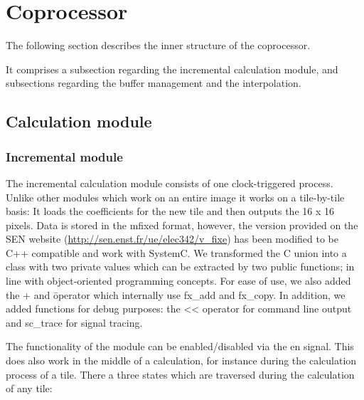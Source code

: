 

\section{Coprocessor}

The following section describes the inner structure of the coprocessor.

It comprises a subsection regarding the incremental calculation module, and subsections regarding the buffer management and the interpolation.


\subsection{Calculation module}

\subsubsection{Incremental module}

The incremental calculation module consists of one clock-triggered process. Unlike other modules which work on an entire image it works on a tile-by-tile basis: It loads the coefficients for the new tile and then outputs the 16 x 16 pixels. Data is stored in the mfixed format, however, the version provided on the SEN website (\url{http://sen.enst.fr/ue/elec342/v_fixe}) has been modified to be C++ compatible and work with SystemC. We transformed the C union into a class with two private values which can be extracted by two public functions; in line with object-oriented programming concepts. For ease of use, we also added the + and \= operator which internally use fx\_add and fx\_copy. In addition, we added functions for debug purposes: the << operator for command line output and sc\_trace for signal tracing.

The functionality of the module can be enabled/disabled via the en signal. This does also work in the middle of a calculation, for instance during the calculation process of a tile. There a three states which are traversed during the calculation of any tile:

